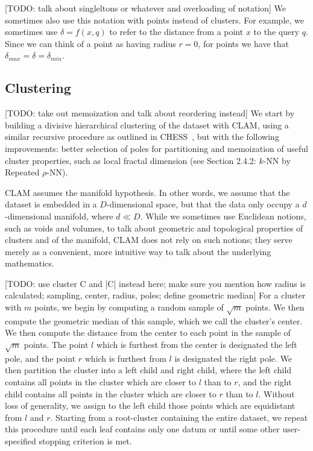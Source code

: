 [TODO: talk about singleltons or whatever and overloading of notation]
We sometimes also use this notation with points instead of clusters. For example, we sometimes use $\delta = f(x, q)$ to refer to the distance 
from a point $x$ to the query $q$. Since we can think of a point as having radius $r=0$, for points we have that $\delta_{max} = \delta = \delta_{min}$.


\subsection{Clustering}
\label{subsec:methods:clustering}

[TODO: take out memoization and talk about reordering instead]
We start by building a divisive hierarchical clustering of the dataset with CLAM, using a 
similar recursive procedure as outlined in CHESS~\cite{ishaq2019clustered}, but with the following 
improvements: better selection of poles for partitioning and memoization of useful cluster properties, 
such as local fractal dimension (see Section 2.4.2: $k$-NN by Repeated $\rho$-NN). 


CLAM assumes the manifold hypothesis. 
In other words, we assume that the dataset is embedded in a $D$-dimensional space, but that the data only occupy 
a $d$-dimensional manifold, where $d \ll D$. 
While we sometimes use Euclidean notions, such as voids and volumes, to talk about geometric and topological 
properties of clusters and of the manifold, CLAM does not rely on such notions; 
they serve merely as a convenient, more intuitive way to talk about the underlying mathematics.

[TODO: use cluster C and |C| instead here; make sure you mention how radius is calculated; sampling, center, radius, poles; 
define geometric median]
For a cluster with $m$ points, we begin by computing a 
random sample of $\sqrt m$ points. We then compute the geometric median of this sample, which we call the 
cluster's center. We then compute the distance from the center to each point in the sample of $\sqrt m$ points. 
The point $l$ which is furthest from the center is designated the left pole, and the point $r$ which is furthest
from $l$ is designated the right pole. We then partition the cluster into a left child and right child, where the 
left child contains all points in the cluster which are closer to $l$ than to $r$, and the right child contains all 
points in the cluster which are closer to $r$ than to $l$. Without loss of generality, we assign to the left child 
those points which are equidistant from $l$ and $r$. Starting from a root-cluster containing the entire dataset, we 
repeat this procedure until each leaf contains only one datum or until some other user-specified stopping criterion 
is met.


